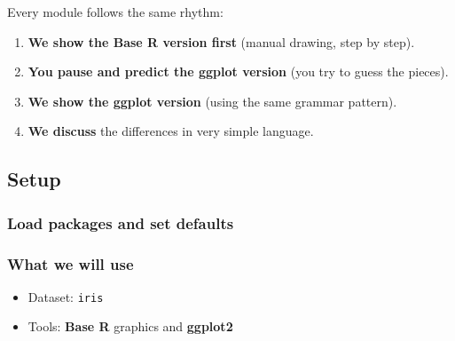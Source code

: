 \documentclass[
  letterpaper,
  DIV=11,
  numbers=noendperiod]{scrartcl}
\newenvironment{Shaded}{\begin{snugshade}}{\end{snugshade}}
\newcommand{\AttributeTok}[1]{\textcolor[rgb]{0.40,0.45,0.13}{#1}}
\newcommand{\CommentTok}[1]{\textcolor[rgb]{0.37,0.37,0.37}{#1}}
\newcommand{\DecValTok}[1]{\textcolor[rgb]{0.68,0.00,0.00}{#1}}
\newcommand{\FloatTok}[1]{\textcolor[rgb]{0.68,0.00,0.00}{#1}}
\newcommand{\FunctionTok}[1]{\textcolor[rgb]{0.28,0.35,0.67}{#1}}
\newcommand{\NormalTok}[1]{\textcolor[rgb]{0.00,0.23,0.31}{#1}}
\newcommand{\SpecialCharTok}[1]{\textcolor[rgb]{0.37,0.37,0.37}{#1}}
\newcommand{\StringTok}[1]{\textcolor[rgb]{0.13,0.47,0.30}{#1}}
\providecommand{\tightlist}{%
  \setlength{\itemsep}{0pt}\setlength{\parskip}{0pt}}\usepackage{longtable,booktabs,array}
\begin{document}
Every module follows the same rhythm:

\begin{enumerate}
\def\labelenumi{\arabic{enumi}.}
\tightlist
\item
  \textbf{We show the Base R version first} (manual drawing, step by
  step).
\item
  \textbf{You pause and predict the ggplot version} (you try to guess
  the pieces).
\item
  \textbf{We show the ggplot version} (using the same grammar pattern).
\item
  \textbf{We discuss} the differences in very simple language.
\end{enumerate}

\subsection{Setup}\label{setup}

\subsubsection{Load packages and set
defaults}\label{load-packages-and-set-defaults}

\begin{Shaded}
\end{Shaded}

\subsubsection{What we will use}\label{what-we-will-use}

\begin{itemize}
\tightlist
\item
  Dataset: \texttt{iris}
\item
  Tools: \textbf{Base R} graphics and \textbf{ggplot2}
\end{itemize}
\end{document}
